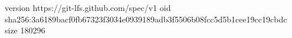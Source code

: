 version https://git-lfs.github.com/spec/v1
oid sha256:3a6189bacf0fb67323f3034e0939189adb3f5506b08fcc5d5b1cee19cc19cbdc
size 180296
